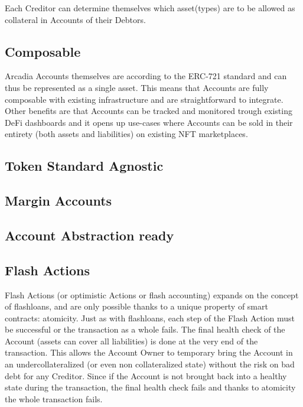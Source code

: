 \documentclass[sigconf,nonacm]{acmart}
\begin{document}
Each Creditor can determine themselves which asset(types) are to be allowed as collateral in Accounts of their Debtors.

\subsection{Composable}
Arcadia Accounts themselves are according to the ERC-721 standard and can thus be represented as a single asset.
This means that Accounts are fully composable with existing infrastructure and are straightforward to integrate.
Other benefits are that Accounts can be tracked and monitored trough existing DeFi dashboards and it opens up use-cases where Accounts can be sold in their entirety (both assets and liabilities) on existing NFT marketplaces.

\subsection{Token Standard Agnostic}

\subsection{Margin Accounts}

\subsection{Account Abstraction ready}

\subsection{Flash Actions}
Flash Actions (or optimistic Actions or flash accounting) expands on the concept of flashloans, and are only possible thanks to a unique property of smart contracts: atomicity\cite{xie2022towards}.
Just as with flashloans, each step of the Flash Action must be successful or the transaction as a whole fails.
The final health check of the Account (assets can cover all liabilities) is done at the very end of the transaction.
This allows the Account Owner to temporary bring the Account in an undercollateralized (or even non collateralized state) without the risk on bad debt for any Creditor.
Since if the Account is not brought back into a healthy state during the transaction, the final health check fails and thanks to atomicity the whole transaction fails.
\end{document}
